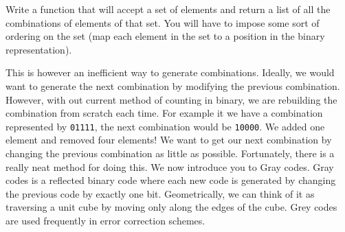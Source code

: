 \begin{problem}
Write a function that will accept a set of elements and return a list of all the combinations
of elements of that set.  You will have to impose some sort of ordering on the set (map each element
in the set to a position in the binary representation).
\end{problem}

This is however an inefficient way to generate combinations.  Ideally, we would want
to generate the next combination by modifying the previous combination.  However, with
out current method of counting in binary, we are rebuilding the combination from scratch
each time.  For example it we have a combination represented by \texttt{01111}, the next
combination would be \texttt{10000}.  We added one element and removed four elements!
We want to get our next combination by changing the previous combination as little as possible.
Fortunately, there is a really neat method for doing this.  We now introduce you to
Gray codes.  Gray codes is a reflected binary code where each new code is generated by
changing the previous code by exactly one bit.  Geometrically, we can think of it as
traversing a unit cube by moving only along the edges of the cube.  Grey codes are used frequently in error correction schemes.

